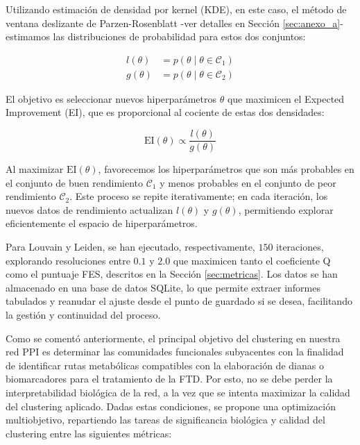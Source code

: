 Utilizando estimación de densidad por kernel (KDE), en este caso, el método de ventana deslizante de Parzen-Rosenblatt -ver detalles en Sección \ref{sec:anexo_a}- estimamos las distribuciones de probabilidad para estos dos conjuntos:

\begin{equation}
	\begin{aligned}
		l(\theta) &= p(\theta \mid \theta \in \mathcal{C}_1) \\
		g(\theta) &= p(\theta \mid \theta \in \mathcal{C}_2)
	\end{aligned}
\end{equation}

El objetivo es seleccionar nuevos hiperparámetros \( \theta \) que maximicen el Expected Improvement (EI), que es proporcional al cociente de estas dos densidades:

\begin{equation}
	\mathrm{EI}(\theta) \propto \frac{l(\theta)}{g(\theta)}
\end{equation}

Al maximizar \( \mathrm{EI}(\theta) \), favorecemos los hiperparámetros que son más probables en el conjunto de buen rendimiento \( \mathcal{C}_1 \) y menos probables en el conjunto de peor rendimiento \( \mathcal{C}_2 \). Este proceso se repite iterativamente; en cada iteración, los nuevos datos de rendimiento actualizan \( l(\theta) \) y \( g(\theta) \), permitiendo explorar eficientemente el espacio de hiperparámetros.

Para Louvain y Leiden, se han ejecutado, respectivamente, \(150\) iteraciones, explorando resoluciones entre \(0.1\) y \(2.0\) que maximicen tanto el coeficiente Q como el puntuaje FES, descritos en la Sección \ref{sec:metricas}. Los datos se han almacenado en una base de datos SQLite, lo que permite extraer informes tabulados y reanudar el ajuste desde el punto de guardado si se desea, facilitando la gestión y continuidad del proceso.


Como se comentó anteriormente, el principal objetivo del clustering en nuestra red PPI es determinar las comunidades funcionales subyacentes con la finalidad de identificar rutas metabólicas compatibles con la elaboración de dianas o biomarcadores para el tratamiento de la FTD. Por esto, no se debe perder la interpretabilidad biológica de la red, a la vez que se intenta maximizar la calidad del clustering aplicado. Dadas estas condiciones, se propone una optimización multiobjetivo, repartiendo las tareas de significancia biológica y calidad del clustering entre las siguientes métricas:

